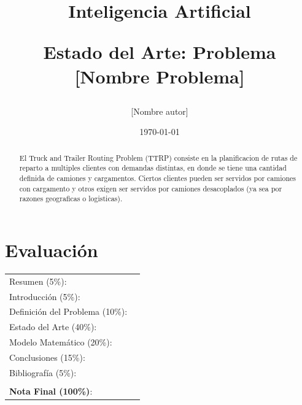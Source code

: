 \documentclass[letter, 10pt]{article}
\begin{document}
\title{Inteligencia Artificial \\ \begin{Large}Estado del Arte: Problema [Nombre Problema]\end{Large}}
\author{[Nombre autor]}
\date{\today}
\maketitle


\section*{Evaluaci\'on}

\begin{tabular}{ll}
Resumen (5\%): & \underline{\hspace{2cm}} \\
Introducci\'on (5\%):  & \underline{\hspace{2cm}} \\
Definici\'on del Problema (10\%):  & \underline{\hspace{2cm}} \\
Estado del Arte (40\%):  & \underline{\hspace{2cm}} \\
Modelo Matem\'atico (20\%): &  \underline{\hspace{2cm}}\\
Conclusiones (15\%): &  \underline{\hspace{2cm}}\\
Bibliograf\'ia (5\%): & \underline{\hspace{2cm}}\\
 &  \\
\textbf{Nota Final (100\%)}:   & \underline{\hspace{2cm}}
\end{tabular}
\vspace{2cm}


\begin{abstract}
El Truck and Trailer Routing Problem (TTRP) consiste en la planificacion de rutas de reparto a multiples clientes con demandas distintas, en donde
se tiene una cantidad definida de camiones y cargamentos. Ciertos clientes pueden ser servidos por camiones con cargamento y otros exigen ser servidos
por camiones desacoplados (ya sea por razones geograficas o logisticas).

\end{abstract}
\end{document}
